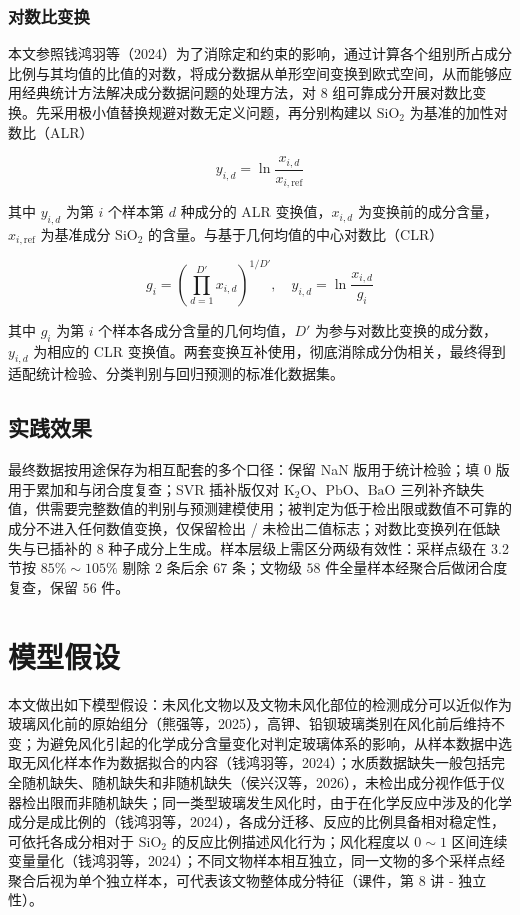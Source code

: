 \documentclass{ctexart}
\begin{document}
\subsubsection{对数比变换}

本文参照钱鸿羽等（2024）\cite{qianhongyu2024}为了消除定和约束的影响，通过计算各个组别所占成分比例与其均值的比值的对数，将成分数据从单形空间变换到欧式空间，从而能够应用经典统计方法解决成分数据问题的处理方法，对 $8$ 组可靠成分开展对数比变换。先采用极小值替换规避对数无定义问题，再分别构建以 $\mathrm{SiO_2}$ 为基准的加性对数比（ALR）

\begin{equation*}
y_{i,d}=\ln\frac{x_{i,d}}{x_{i,\mathrm{ref}}}
\end{equation*}

其中 $y_{i,d}$ 为第 $i$ 个样本第 $d$ 种成分的 ALR 变换值，$x_{i,d}$ 为变换前的成分含量，$x_{i,\mathrm{ref}}$ 为基准成分 $\mathrm{SiO_2}$ 的含量。与基于几何均值的中心对数比（CLR）

\begin{equation*}
g_{i}=\left(\prod_{d=1}^{D'}x_{i,d}\right)^{1/D'},\quad y_{i,d}=\ln\frac{x_{i,d}}{g_{i}}
\end{equation*}

其中 $g_i$ 为第 $i$ 个样本各成分含量的几何均值，$D'$ 为参与对数比变换的成分数，$y_{i,d}$ 为相应的 CLR 变换值。两套变换互补使用，彻底消除成分伪相关，最终得到适配统计检验、分类判别与回归预测的标准化数据集。

\subsection{实践效果}

最终数据按用途保存为相互配套的多个口径：保留 NaN 版用于统计检验；填 $0$ 版用于累加和与闭合度复查；SVR 插补版仅对 $\mathrm{K_2O}$、$\mathrm{PbO}$、$\mathrm{BaO}$ 三列补齐缺失值，供需要完整数值的判别与预测建模使用；被判定为低于检出限或数值不可靠的成分不进入任何数值变换，仅保留检出 / 未检出二值标志；对数比变换列在低缺失与已插补的 $8$ 种子成分上生成。样本层级上需区分两级有效性：采样点级在 3.2 节按 $85\%\sim105\%$ 剔除 $2$ 条后余 $67$ 条；文物级 $58$ 件全量样本经聚合后做闭合度复查，保留 $56$ 件。

\section{模型假设}

本文做出如下模型假设：未风化文物以及文物未风化部位的检测成分可以近似作为玻璃风化前的原始组分（熊强等，2025），高钾、铅钡玻璃类别在风化前后维持不变；为避免风化引起的化学成分含量变化对判定玻璃体系的影响，从样本数据中选取无风化样本作为数据拟合的内容（钱鸿羽等，2024）；水质数据缺失一般包括完全随机缺失、随机缺失和非随机缺失（侯兴汉等，2026），未检出成分视作低于仪器检出限而非随机缺失；同一类型玻璃发生风化时，由于在化学反应中涉及的化学成分是成比例的（钱鸿羽等，2024），各成分迁移、反应的比例具备相对稳定性，可依托各成分相对于 $\mathrm{SiO_2}$ 的反应比例描述风化行为；风化程度以 $0\sim1$ 区间连续变量量化（钱鸿羽等，2024）；不同文物样本相互独立，同一文物的多个采样点经聚合后视为单个独立样本，可代表该文物整体成分特征（课件，第 8 讲 - 独立性）。
\end{document}
